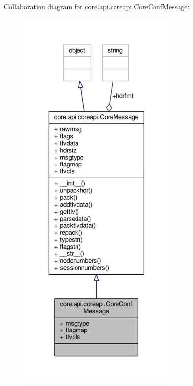 Collaboration diagram for core.\+api.\+coreapi.\+Core\+Conf\+Message\+:
\nopagebreak
\begin{figure}[H]
\begin{center}
\leavevmode
\includegraphics[height=550pt]{classcore_1_1api_1_1coreapi_1_1_core_conf_message__coll__graph}
\end{center}
\end{figure}
